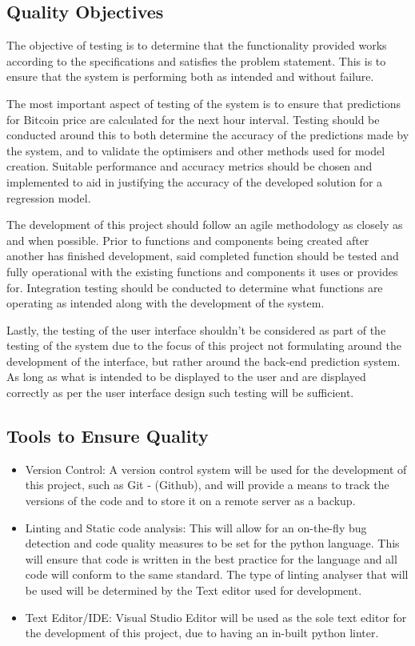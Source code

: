 \documentclass[oneside, 12pt]{article}
\begin{document}
	\subsection{Quality Objectives}
	The objective of testing is to determine that the functionality provided works according to the specifications and satisfies the problem statement. This is to ensure that the system is performing both as intended and without failure.
	
	The most important aspect of testing of the system is to ensure that predictions for Bitcoin price are calculated for the next hour interval. Testing should be conducted around this to both determine the accuracy of the predictions made by the system, and to validate the optimisers and other methods used for model creation. Suitable performance and accuracy metrics should be chosen and implemented to aid in justifying the accuracy of the developed solution for a regression model.
	
	The development of this project should follow an agile methodology as closely as and when possible. Prior to functions and components being created after another has finished development, said completed function should be tested and fully operational with the existing functions and components it uses or provides for. Integration testing should be conducted to determine what functions are operating as intended along with the development of the system.
	
	Lastly, the testing of the user interface shouldn't be considered as part of the testing of the system due to the focus of this project not formulating around the development of the interface, but rather around the back-end prediction system. As long as what is intended to be displayed to the user and are displayed correctly as per the user interface design such testing will be sufficient.
	
	\subsection{Tools to Ensure Quality}
	
	\begin{itemize}
		\item Version Control: A version control system will be used for the development of this project, such as Git - (Github), and will provide a means to track the versions of the code and to store it on a remote server as a backup.
		\item Linting and Static code analysis: This will allow for an on-the-fly bug detection and code quality measures to be set for the python language. This will ensure that code is written in the best practice for the language and all code will conform to the same standard. The type of linting analyser that will be used will be determined by the Text editor used for development.
		\item Text Editor/IDE: Visual Studio Editor will be used as the sole text editor for the development of this project, due to having an in-built python linter.
	\end{itemize}
	
\end{document}
